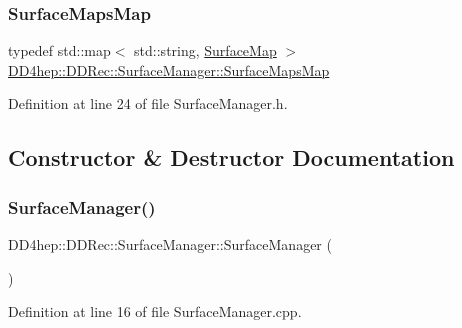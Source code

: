 \subsubsection{\texorpdfstring{Surface\+Maps\+Map}{SurfaceMapsMap}}
{\footnotesize\ttfamily typedef std\+::map$<$ std\+::string, \hyperlink{namespace_d_d4hep_1_1_d_d_rec_a04db40c967eb23286f472ac1c17931d1}{Surface\+Map} $>$ \hyperlink{class_d_d4hep_1_1_d_d_rec_1_1_surface_manager_af1cf671ee1a3a58ed722882a98970679}{D\+D4hep\+::\+D\+D\+Rec\+::\+Surface\+Manager\+::\+Surface\+Maps\+Map}\hspace{0.3cm}{\ttfamily [private]}}



Definition at line 24 of file Surface\+Manager.\+h.



\subsection{Constructor \& Destructor Documentation}
\hypertarget{class_d_d4hep_1_1_d_d_rec_1_1_surface_manager_ade79c900350308b6523dd7964e156af3}{}\label{class_d_d4hep_1_1_d_d_rec_1_1_surface_manager_ade79c900350308b6523dd7964e156af3} 
\subsubsection{\texorpdfstring{Surface\+Manager()}{SurfaceManager()}}
{\footnotesize\ttfamily D\+D4hep\+::\+D\+D\+Rec\+::\+Surface\+Manager\+::\+Surface\+Manager (\begin{DoxyParamCaption}{ }\end{DoxyParamCaption})}



Definition at line 16 of file Surface\+Manager.\+cpp.

\hypertarget{class_d_d4hep_1_1_d_d_rec_1_1_surface_manager_aaa040a3a6384a601d1c3bc1e79ba4f3f}{}\label{class_d_d4hep_1_1_d_d_rec_1_1_surface_manager_aaa040a3a6384a601d1c3bc1e79ba4f3f} 
